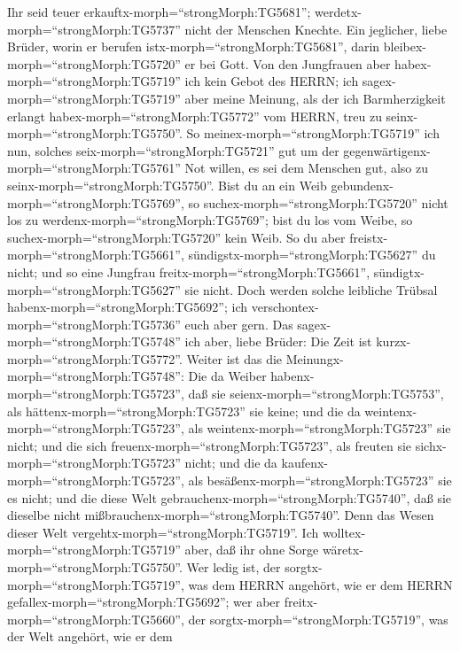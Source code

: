 Ihr seid teuer erkauftx-morph=``strongMorph:TG5681'';
werdetx-morph=``strongMorph:TG5737'' nicht der Menschen Knechte.
 Ein jeglicher, liebe Brüder, worin er berufen
istx-morph=``strongMorph:TG5681'', darin
bleibex-morph=``strongMorph:TG5720'' er bei Gott.  Von den
Jungfrauen aber habex-morph=``strongMorph:TG5719'' ich kein Gebot des
HERRN; ich sagex-morph=``strongMorph:TG5719'' aber meine Meinung, als
der ich Barmherzigkeit erlangt habex-morph=``strongMorph:TG5772'' vom
HERRN, treu zu seinx-morph=``strongMorph:TG5750''.  So
meinex-morph=``strongMorph:TG5719'' ich nun, solches
seix-morph=``strongMorph:TG5721'' gut um der
gegenwärtigenx-morph=``strongMorph:TG5761'' Not willen, es sei dem
Menschen gut, also zu seinx-morph=``strongMorph:TG5750''. 
Bist du an ein Weib gebundenx-morph=``strongMorph:TG5769'', so
suchex-morph=``strongMorph:TG5720'' nicht los zu
werdenx-morph=``strongMorph:TG5769''; bist du los vom Weibe, so
suchex-morph=``strongMorph:TG5720'' kein Weib.  So du aber
freistx-morph=``strongMorph:TG5661'',
sündigstx-morph=``strongMorph:TG5627'' du nicht; und so eine Jungfrau
freitx-morph=``strongMorph:TG5661'',
sündigtx-morph=``strongMorph:TG5627'' sie nicht. Doch werden solche
leibliche Trübsal habenx-morph=``strongMorph:TG5692''; ich
verschontex-morph=``strongMorph:TG5736'' euch aber gern. 
Das sagex-morph=``strongMorph:TG5748'' ich aber, liebe Brüder: Die Zeit
ist kurzx-morph=``strongMorph:TG5772''. Weiter ist das die
Meinungx-morph=``strongMorph:TG5748'': Die da Weiber
habenx-morph=``strongMorph:TG5723'', daß sie
seienx-morph=``strongMorph:TG5753'', als
hättenx-morph=``strongMorph:TG5723'' sie keine; und die da
weintenx-morph=``strongMorph:TG5723'', als
weintenx-morph=``strongMorph:TG5723'' sie nicht;  und die
sich freuenx-morph=``strongMorph:TG5723'', als freuten sie
sichx-morph=``strongMorph:TG5723'' nicht; und die da
kaufenx-morph=``strongMorph:TG5723'', als
besäßenx-morph=``strongMorph:TG5723'' sie es nicht;  und
die diese Welt gebrauchenx-morph=``strongMorph:TG5740'', daß sie
dieselbe nicht mißbrauchenx-morph=``strongMorph:TG5740''. Denn das Wesen
dieser Welt vergehtx-morph=``strongMorph:TG5719''.  Ich
wolltex-morph=``strongMorph:TG5719'' aber, daß ihr ohne Sorge
wäretx-morph=``strongMorph:TG5750''. Wer ledig ist, der
sorgtx-morph=``strongMorph:TG5719'', was dem HERRN angehört, wie er dem
HERRN gefallex-morph=``strongMorph:TG5692'';  wer aber
freitx-morph=``strongMorph:TG5660'', der
sorgtx-morph=``strongMorph:TG5719'', was der Welt angehört, wie er dem
